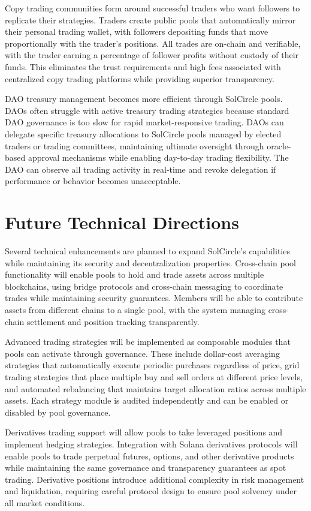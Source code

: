 \documentclass[11pt,a4paper]{article}
\begin{document}
Copy trading communities form around successful traders who want followers to replicate their strategies. Traders create public pools that automatically mirror their personal trading wallet, with followers depositing funds that move proportionally with the trader's positions. All trades are on-chain and verifiable, with the trader earning a percentage of follower profits without custody of their funds. This eliminates the trust requirements and high fees associated with centralized copy trading platforms while providing superior transparency.

DAO treasury management becomes more efficient through SolCircle pools. DAOs often struggle with active treasury trading strategies because standard DAO governance is too slow for rapid market-responsive trading. DAOs can delegate specific treasury allocations to SolCircle pools managed by elected traders or trading committees, maintaining ultimate oversight through oracle-based approval mechanisms while enabling day-to-day trading flexibility. The DAO can observe all trading activity in real-time and revoke delegation if performance or behavior becomes unacceptable.

\section{Future Technical Directions}

Several technical enhancements are planned to expand SolCircle's capabilities while maintaining its security and decentralization properties. Cross-chain pool functionality will enable pools to hold and trade assets across multiple blockchains, using bridge protocols and cross-chain messaging to coordinate trades while maintaining security guarantees. Members will be able to contribute assets from different chains to a single pool, with the system managing cross-chain settlement and position tracking transparently.

Advanced trading strategies will be implemented as composable modules that pools can activate through governance. These include dollar-cost averaging strategies that automatically execute periodic purchases regardless of price, grid trading strategies that place multiple buy and sell orders at different price levels, and automated rebalancing that maintains target allocation ratios across multiple assets. Each strategy module is audited independently and can be enabled or disabled by pool governance.

Derivatives trading support will allow pools to take leveraged positions and implement hedging strategies. Integration with Solana derivatives protocols will enable pools to trade perpetual futures, options, and other derivative products while maintaining the same governance and transparency guarantees as spot trading. Derivative positions introduce additional complexity in risk management and liquidation, requiring careful protocol design to ensure pool solvency under all market conditions.
\end{document}
